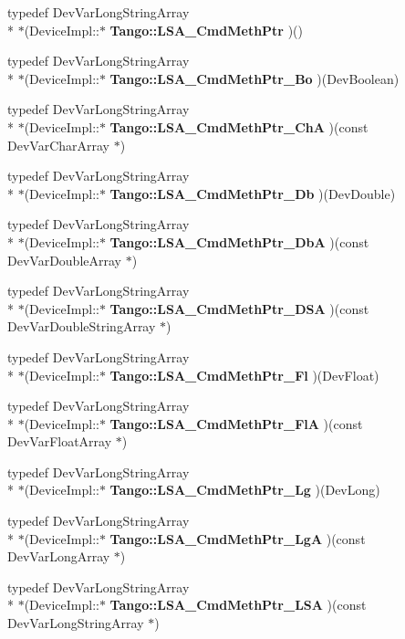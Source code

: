 \begin{DoxyCompactItemize}
\item 
typedef Dev\-Var\-Long\-String\-Array \\*
$\ast$(Device\-Impl\-::$\ast$ {\bf Tango\-::\-L\-S\-A\-\_\-\-Cmd\-Meth\-Ptr} )()
\item 
typedef Dev\-Var\-Long\-String\-Array \\*
$\ast$(Device\-Impl\-::$\ast$ {\bf Tango\-::\-L\-S\-A\-\_\-\-Cmd\-Meth\-Ptr\-\_\-\-Bo} )(Dev\-Boolean)
\item 
typedef Dev\-Var\-Long\-String\-Array \\*
$\ast$(Device\-Impl\-::$\ast$ {\bf Tango\-::\-L\-S\-A\-\_\-\-Cmd\-Meth\-Ptr\-\_\-\-Ch\-A} )(const Dev\-Var\-Char\-Array $\ast$)
\item 
typedef Dev\-Var\-Long\-String\-Array \\*
$\ast$(Device\-Impl\-::$\ast$ {\bf Tango\-::\-L\-S\-A\-\_\-\-Cmd\-Meth\-Ptr\-\_\-\-Db} )(Dev\-Double)
\item 
typedef Dev\-Var\-Long\-String\-Array \\*
$\ast$(Device\-Impl\-::$\ast$ {\bf Tango\-::\-L\-S\-A\-\_\-\-Cmd\-Meth\-Ptr\-\_\-\-Db\-A} )(const Dev\-Var\-Double\-Array $\ast$)
\item 
typedef Dev\-Var\-Long\-String\-Array \\*
$\ast$(Device\-Impl\-::$\ast$ {\bf Tango\-::\-L\-S\-A\-\_\-\-Cmd\-Meth\-Ptr\-\_\-\-D\-S\-A} )(const Dev\-Var\-Double\-String\-Array $\ast$)
\item 
typedef Dev\-Var\-Long\-String\-Array \\*
$\ast$(Device\-Impl\-::$\ast$ {\bf Tango\-::\-L\-S\-A\-\_\-\-Cmd\-Meth\-Ptr\-\_\-\-Fl} )(Dev\-Float)
\item 
typedef Dev\-Var\-Long\-String\-Array \\*
$\ast$(Device\-Impl\-::$\ast$ {\bf Tango\-::\-L\-S\-A\-\_\-\-Cmd\-Meth\-Ptr\-\_\-\-Fl\-A} )(const Dev\-Var\-Float\-Array $\ast$)
\item 
typedef Dev\-Var\-Long\-String\-Array \\*
$\ast$(Device\-Impl\-::$\ast$ {\bf Tango\-::\-L\-S\-A\-\_\-\-Cmd\-Meth\-Ptr\-\_\-\-Lg} )(Dev\-Long)
\item 
typedef Dev\-Var\-Long\-String\-Array \\*
$\ast$(Device\-Impl\-::$\ast$ {\bf Tango\-::\-L\-S\-A\-\_\-\-Cmd\-Meth\-Ptr\-\_\-\-Lg\-A} )(const Dev\-Var\-Long\-Array $\ast$)
\item 
typedef Dev\-Var\-Long\-String\-Array \\*
$\ast$(Device\-Impl\-::$\ast$ {\bf Tango\-::\-L\-S\-A\-\_\-\-Cmd\-Meth\-Ptr\-\_\-\-L\-S\-A} )(const Dev\-Var\-Long\-String\-Array $\ast$)

\end{DoxyCompactItemize}
